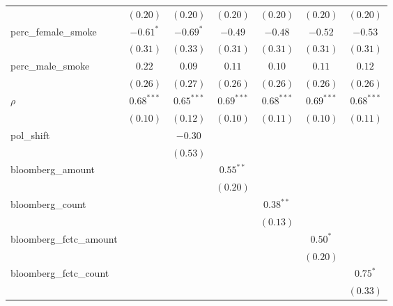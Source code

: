 \begin{table}[!h]
\begin{center}
\begin{tabular}{l c c c c c c }
                        & $(0.20)$     & $(0.20)$     & $(0.20)$     & $(0.20)$     & $(0.20)$     & $(0.20)$     \\
perc\_female\_smoke     & $-0.61^{*}$  & $-0.69^{*}$  & $-0.49$      & $-0.48$      & $-0.52$      & $-0.53$      \\
                        & $(0.31)$     & $(0.33)$     & $(0.31)$     & $(0.31)$     & $(0.31)$     & $(0.31)$     \\
perc\_male\_smoke       & $0.22$       & $0.09$       & $0.11$       & $0.10$       & $0.11$       & $0.12$       \\
                        & $(0.26)$     & $(0.27)$     & $(0.26)$     & $(0.26)$     & $(0.26)$     & $(0.26)$     \\
$\rho$                  & $0.68^{***}$ & $0.65^{***}$ & $0.69^{***}$ & $0.68^{***}$ & $0.69^{***}$ & $0.68^{***}$ \\
                        & $(0.10)$     & $(0.12)$     & $(0.10)$     & $(0.11)$     & $(0.10)$     & $(0.11)$     \\
pol\_shift              &              & $-0.30$      &              &              &              &              \\
                        &              & $(0.53)$     &              &              &              &              \\
bloomberg\_amount       &              &              & $0.55^{**}$  &              &              &              \\
                        &              &              & $(0.20)$     &              &              &              \\
bloomberg\_count        &              &              &              & $0.38^{**}$  &              &              \\
                        &              &              &              & $(0.13)$     &              &              \\
bloomberg\_fctc\_amount &              &              &              &              & $0.50^{*}$   &              \\
                        &              &              &              &              & $(0.20)$     &              \\
bloomberg\_fctc\_count  &              &              &              &              &              & $0.75^{*}$   \\
                        &              &              &              &              &              & $(0.33)$     \\

\end{tabular}
\end{center}
\end{table}
